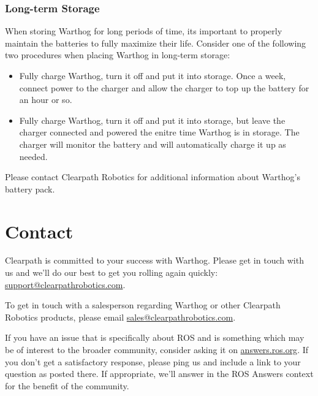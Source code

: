 \documentclass[]{clearpath-latex/clearpath-manual}
\begin{document}
\subsubsection{Long-term Storage}

When storing Warthog for long periods of time, its important to properly maintain the batteries to fully maximize their life.  Consider one of the following two procedures when placing Warthog in long-term storage:

\begin{itemize}[nolistsep]
  \item Fully charge Warthog, turn it off and put it into storage.  Once a week, connect power to the charger and allow the charger to top up the battery for an hour or so.
  \item Fully charge Warthog, turn it off and put it into storage, but leave the charger connected and powered the enitre time Warthog is in storage.  The charger will monitor the battery and will automatically charge it up as needed.
\end{itemize}


Please contact Clearpath Robotics for additional information about Warthog's battery pack.


\section{Contact}
\label{contact}

Clearpath is committed to your success with Warthog. Please get in touch with us and we’ll do our best to get
you rolling again quickly: \url{support@clearpathrobotics.com}.

To get in touch with a salesperson regarding Warthog or other Clearpath Robotics products, please email
\url{sales@clearpathrobotics.com}.

If you have an issue that is specifically about ROS and is something which may be of interest to the broader
community, consider asking it on \url{answers.ros.org}. If you don’t get a satisfactory response, please ping us and
include a link to your question as posted there. If appropriate, we’ll answer in the ROS Answers context for
the benefit of the community.
\end{document}
